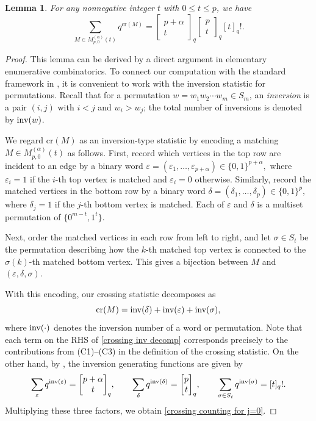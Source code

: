 \documentclass{amsart}
\newcommand{\qbinom}[2]{{\begin{bmatrix}#1\\#2\end{bmatrix}}_q}
\newcommand{\Cr}{\mathrm{cr}}
\theoremstyle{plain}
\newtheorem{lem}[thm]{Lemma}
\theoremstyle{remark}
\numberwithin{equation}{section}
\begin{document}
\begin{lem} \label{Lem_q cr evaluation j=0}
For any nonnegative integer $t$ with $0 \le t \le p$, we have
    \begin{equation} \label{crossing counting for j=0}
        \sum_{M\in M_{p,0}^{(\alpha)}(t)}q^{\Cr(M)}=\qbinom{p+\alpha}{t} \qbinom{p}{t}   [t]_{q}!.
    \end{equation}
\end{lem}
\begin{proof}
This lemma can be derived by a direct argument in elementary enumerative combinatorics. To connect our computation with the standard framework in \cite{Stanley12}, it is convenient to work with the inversion statistic for permutations. Recall that for a permutation $w = w_1 w_2 \cdots w_m \in S_m$, an \emph{inversion} is a pair $(i,j)$ with $i<j$ and $w_i > w_j$; the total number of inversions is denoted by $\textup{inv}(w)$.

We regard $\Cr(M)$ as an inversion-type statistic by encoding a matching $M \in M_{p,0}^{(\alpha)}(t)$ as follows.  
First, record which vertices in the top row are incident to an edge by a
binary word  $ \varepsilon = (\varepsilon_1,\dots,\varepsilon_{p+\alpha}) \in \{0,1\}^{p+\alpha},$ where $\varepsilon_i = 1$ if the $i$-th top vertex is matched and $\varepsilon_i = 0$ otherwise. Similarly, record the matched vertices in the
bottom row by a binary word $\delta = (\delta_1,\dots,\delta_p) \in \{0,1\}^{p},$ where $\delta_j = 1$ if the $j$-th bottom vertex is matched. Each of $\varepsilon$ and $\delta$ is a multiset permutation of $\{0^{m-t}, 1^t\}$. 

Next, order the matched vertices in each row from left to right, and let
$\sigma \in S_t$ be the permutation describing how the $k$-th matched top
vertex is connected to the $\sigma(k)$-th matched bottom vertex. This gives a
bijection between $M$ and $(\varepsilon,\delta,\sigma)$. 

With this encoding, our crossing statistic decomposes as
\begin{equation} \label{crossing inv decomp}
\Cr(M) = \textup{inv}(\delta) + \textup{inv}(\varepsilon) +  \textup{inv}(\sigma),
\end{equation} 
where $\textup{inv}(\cdot)$ denotes the inversion number of a word or permutation. Note that each term on the RHS of \eqref{crossing inv decomp} corresponds precisely to the contributions from (C1)--(C3) in the definition of the crossing statistic.
On the other hand, by \cite[Propositions~1.7.1 and ~1.3.13]{Stanley12}, the inversion generating functions are given by 
$$
\sum_{\varepsilon} q^{\textup{inv}(\varepsilon)} = \qbinom{p+\alpha}{t},
\qquad
\sum_{\delta} q^{\textup{inv}(\delta)} = \qbinom{p}{t}, \qquad \sum_{\sigma\in S_t} q^{\textup{inv}(\sigma)} = [t]_{q}!.
$$
Multiplying these three factors, we obtain \eqref{crossing counting for j=0}. 
\end{proof}
 
\end{document}
